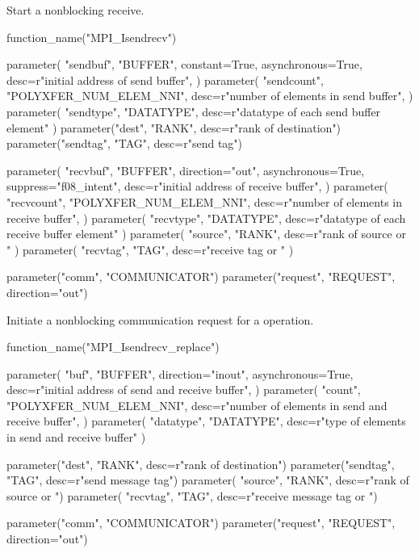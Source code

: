 Start a nonblocking receive.

\begin{mpi-binding}
    function_name("MPI_Isendrecv")

    parameter(
        "sendbuf",
        "BUFFER",
        constant=True,
        asynchronous=True,
        desc=r"initial address of send buffer",
    )
    parameter(
        "sendcount",
        "POLYXFER_NUM_ELEM_NNI",
        desc=r"number of elements in send buffer",
    )
    parameter(
        "sendtype", "DATATYPE", desc=r"datatype of each send buffer element"
    )
    parameter("dest", "RANK", desc=r"rank of destination")
    parameter("sendtag", "TAG", desc=r"send tag")

    parameter(
        "recvbuf",
        "BUFFER",
        direction="out",
        asynchronous=True,
        suppress="f08_intent",
        desc=r"initial address of receive buffer",
    )
    parameter(
        "recvcount",
        "POLYXFER_NUM_ELEM_NNI",
        desc=r"number of elements in receive buffer",
    )
    parameter(
        "recvtype", "DATATYPE", desc=r"datatype of each receive buffer element"
    )
    parameter(
        "source", "RANK", desc=r"rank of source or "
    )
    parameter(
        "recvtag", "TAG", desc=r"receive tag or "
    )

    parameter("comm", "COMMUNICATOR")
    parameter("request", "REQUEST", direction="out")
\end{mpi-binding}

Initiate a nonblocking communication request for a  operation.

\begin{mpi-binding}
    function_name("MPI_Isendrecv_replace")

    parameter(
        "buf",
        "BUFFER",
        direction="inout",
        asynchronous=True,
        desc=r"initial address of send and receive buffer",
    )
    parameter(
        "count",
        "POLYXFER_NUM_ELEM_NNI",
        desc=r"number of elements in send and receive buffer",
    )
    parameter(
        "datatype", "DATATYPE", desc=r"type of elements in send and receive buffer"
    )

    parameter("dest", "RANK", desc=r"rank of destination")
    parameter("sendtag", "TAG", desc=r"send message tag")
    parameter( "source", "RANK", desc=r"rank of source or ")
    parameter( "recvtag", "TAG", desc=r"receive message tag or ")

    parameter("comm", "COMMUNICATOR")
    parameter("request", "REQUEST", direction="out")
\end{mpi-binding}

